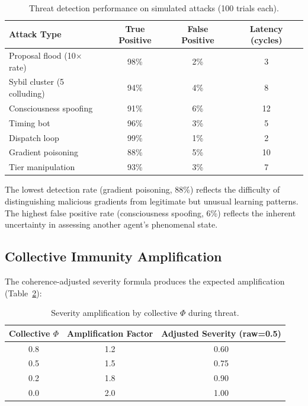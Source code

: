 \documentclass[11pt,a4paper]{article}
\begin{document}
\begin{table}[h]
\centering
\caption{Threat detection performance on simulated attacks (100 trials each).}
\label{tab:detection}
\begin{tabular}{lccc}
\toprule
\textbf{Attack Type} & \textbf{True Positive} & \textbf{False Positive} & \textbf{Latency (cycles)} \\
\midrule
Proposal flood (10$\times$ rate) & 98\% & 2\% & 3 \\
Sybil cluster (5 colluding) & 94\% & 4\% & 8 \\
Consciousness spoofing & 91\% & 6\% & 12 \\
Timing bot & 96\% & 3\% & 5 \\
Dispatch loop & 99\% & 1\% & 2 \\
Gradient poisoning & 88\% & 5\% & 10 \\
Tier manipulation & 93\% & 3\% & 7 \\
\bottomrule
\end{tabular}
\end{table}

The lowest detection rate (gradient poisoning, 88\%) reflects the difficulty of distinguishing malicious gradients from legitimate but unusual learning patterns. The highest false positive rate (consciousness spoofing, 6\%) reflects the inherent uncertainty in assessing another agent's phenomenal state.

\subsection{Collective Immunity Amplification}

The coherence-adjusted severity formula produces the expected amplification (Table~\ref{tab:amplification}):

\begin{table}[h]
\centering
\caption{Severity amplification by collective $\Phi$ during threat.}
\label{tab:amplification}
\begin{tabular}{ccc}
\toprule
\textbf{Collective $\Phi$} & \textbf{Amplification Factor} & \textbf{Adjusted Severity (raw=0.5)} \\
\midrule
0.8 & 1.2 & 0.60 \\
0.5 & 1.5 & 0.75 \\
0.2 & 1.8 & 0.90 \\
0.0 & 2.0 & 1.00 \\
\bottomrule
\end{tabular}
\end{table}
\end{document}
